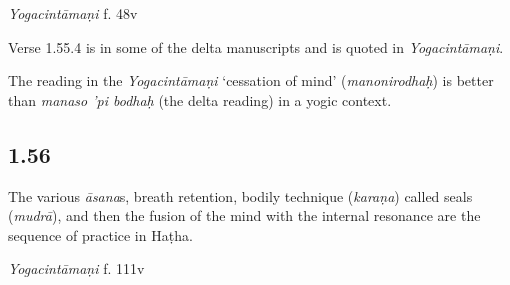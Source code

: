 \begin{ekdosis}

\begin{testimonia}[hp01_055_4]
\emph{Yogacintāmaṇi} f. 48v

\begin{versinnote}
\end{versinnote}

\end{testimonia}

\begin{philcomm}[hp01_055_4]
Verse 1.55.4 is in some of the delta manuscripts and is quoted in \emph{Yogacintāmaṇi}.

The reading in the \emph{Yogacintāmaṇi} `cessation of mind' (\emph{manonirodhaḥ}) is better than \emph{manaso 'pi bodhaḥ} (the delta reading) in a yogic context.
\end{philcomm}

\subsection*{1.56}
\begin{translation}[hp01_056]
The various \emph{āsana}s, breath retention, bodily technique (\emph{karaṇa}) called seals (\emph{mudrā}), and then the fusion of the mind with the internal resonance are the sequence of practice in Haṭha.%
\end{translation}

\begin{sources}[hp01_056]
\end{sources}

\begin{testimonia}[hp01_056]
\emph{Yogacintāmaṇi} f. 111v

\begin{versinnote}
\end{versinnote}


\end{testimonia}
\end{ekdosis}
